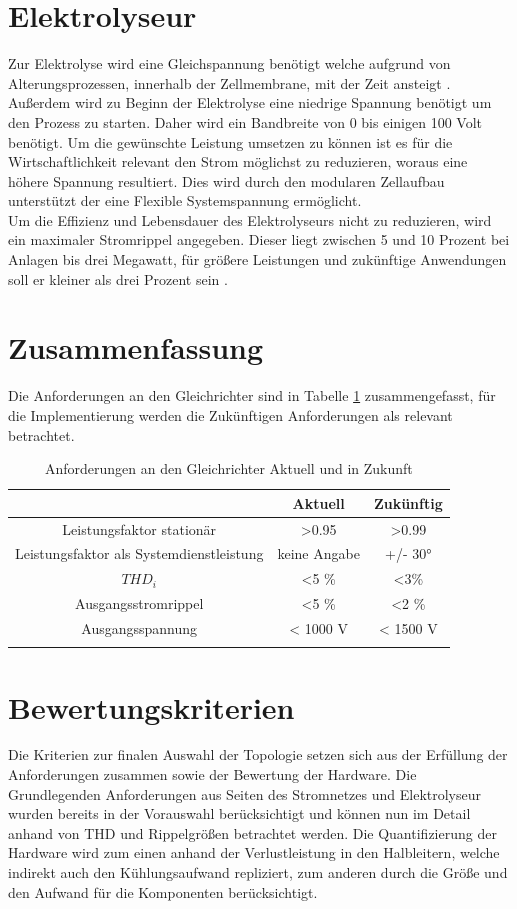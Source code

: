 \section{Elektrolyseur}
Zur Elektrolyse wird eine Gleichspannung benötigt welche aufgrund von Alterungsprozessen, innerhalb der Zellmembrane, mit der Zeit ansteigt \cite{HydrogenElectronicTopologies}. Außerdem wird zu Beginn der Elektrolyse eine niedrige Spannung benötigt um den Prozess zu starten. Daher wird ein Bandbreite von 0 bis einigen 100 Volt benötigt. Um die gewünschte Leistung umsetzen zu können ist es für die Wirtschaftlichkeit relevant den Strom möglichst zu reduzieren, woraus eine höhere Spannung resultiert. Dies wird durch den modularen Zellaufbau unterstützt der eine Flexible Systemspannung ermöglicht. \\
Um die Effizienz und Lebensdauer des Elektrolyseurs nicht zu reduzieren, wird ein maximaler Stromrippel angegeben. Dieser liegt zwischen 5 und 10 Prozent bei Anlagen bis drei Megawatt, für größere Leistungen und zukünftige Anwendungen soll er kleiner als drei Prozent sein \cite{HydrogenRectifier}.


\section{Zusammenfassung}
Die Anforderungen an den Gleichrichter sind in Tabelle \ref{tab:AnfZsm} zusammengefasst, für die Implementierung werden die Zukünftigen Anforderungen als relevant betrachtet.\\
\begin{table}
\caption{Anforderungen an den Gleichrichter Aktuell und in Zukunft}

\begin{tabular}{c|c|c}
	
	& Aktuell & Zukünftig \\
	\hline
	Leistungsfaktor stationär & >0.95 & >0.99 \\
		\hline
	Leistungsfaktor als Systemdienstleistung & keine Angabe & +/- 30° \\
	\hline
	$THD_i$ & <5 \% & <3\% \\
	\hline
	Ausgangsstromrippel & <5 \% & <2 \% \\
	\hline
	Ausgangsspannung & < 1000 V & < 1500 V \\
	
	
	\label{tab:AnfZsm}
\end{tabular}
\end{table}
\section{Bewertungskriterien}
Die Kriterien zur finalen Auswahl der Topologie setzen sich aus der Erfüllung der Anforderungen zusammen sowie der Bewertung der Hardware. Die Grundlegenden Anforderungen aus Seiten des Stromnetzes und Elektrolyseur wurden bereits in der Vorauswahl berücksichtigt und können nun im Detail anhand von \gls{THD} und Rippelgrößen betrachtet werden. Die Quantifizierung der Hardware wird zum einen anhand der Verlustleistung in den Halbleitern, welche indirekt auch den Kühlungsaufwand repliziert, zum anderen durch die Größe und den Aufwand für die Komponenten berücksichtigt.  